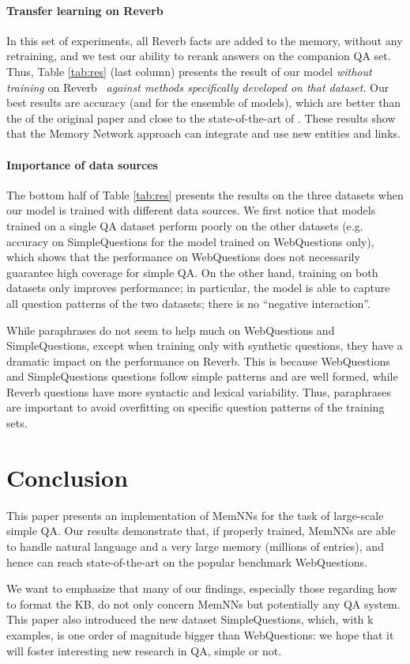 \documentclass[11pt,a4paper]{article}
\newcommand{\wq}{{\sf WebQuestions}\xspace}
\newcommand{\rv}{{\sf Reverb}\xspace}
\newcommand{\fbq}{{\sf SimpleQuestions}\xspace}
\begin{document}
\paragraph{Transfer learning on Reverb}

In this set of experiments, all \rv facts are added to the memory,
without any retraining, and we test our ability to rerank answers on
the companion QA set. Thus, Table \ref{tab:res} (last column) presents
the result of our model {\it without training} on \rv~ {\it against
  methods specifically developed on that dataset}. Our best results
are  accuracy (and  for the ensemble of  models), which
are better than the  of the original paper and close to the
state-of-the-art  of \cite{bordes2014open}. These results show
that the Memory Network approach can integrate and use new entities and
links.





\paragraph{Importance of data sources}

The bottom half of Table \ref{tab:res} presents the results on the
three datasets when our model is trained with different data
sources. We first notice that models trained on a single QA dataset
perform poorly on the other datasets (e.g.  accuracy on \fbq for the
model trained on \wq only), which shows that the performance on \wq
does not necessarily guarantee high coverage for simple QA. On the
other hand, training on both datasets only improves performance; in
particular, the model is able to capture all question patterns of the
two datasets; there is no ``negative interaction''.

While paraphrases do not seem to help much on \wq and \fbq, except
when training only with synthetic questions, they have a dramatic
impact on the performance on \rv. This is because \wq and \fbq
questions follow simple patterns and are well formed, while \rv
questions have more syntactic and lexical variability. Thus,
paraphrases are important to avoid overfitting on specific question
patterns of the training sets.


\section{Conclusion}

  This paper presents an implementation of MemNNs for the task
  of large-scale simple QA.
Our results demonstrate that, if properly trained, MemNNs are able
  to handle natural language and a very large memory (millions of
  entries), and hence can reach state-of-the-art on the popular
  benchmark \wq.


 We want to emphasize that many of our findings, especially those
 regarding how to format the KB, do not only concern MemNNs but
 potentially any QA system.
This paper also introduced the new dataset \fbq, which, with k
 examples, is one order of magnitude bigger than \wq: we hope that it
 will foster interesting new research in QA, simple or not.





\end{document}
